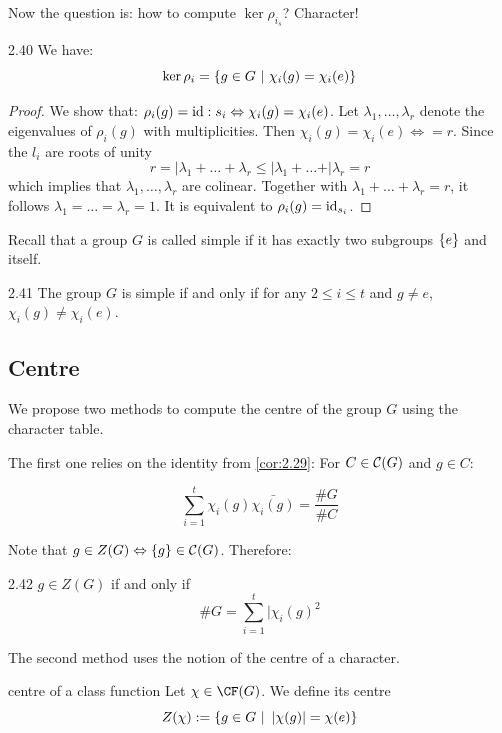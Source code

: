 \documentclass[twoside = false,	%
		headsepline,		%
		parskip = true,
		]{scrbook}						%
\begin{document}
        Now the question is: how to compute $\ker\rho_{i_s}$? Character!
        
        \begin{lemma}{}{2.40}
            We have: $$\ker\rho_i = \left\{  g\in G \ | \ \chi_i(g)=\chi_i(e)\right\}$$     
        \end{lemma}
        \begin{proof}
            We show that: $\rho_i(g)=\mathrm{id}:{s_i}\Leftrightarrow \chi_i(g)=\chi_i(e)$.
            Let $\lambda_1,\dots, \lambda_r$ denote the eigenvalues of $\rho_i(g)$ with multiplicities. Then $\chi_i(g)=\chi_i(e) \Leftrightarrow = r$. Since the $l_i$ are roots of unity
            $$r=\vert{\lambda_1+\dots+\lambda_r}\leq\vert{\lambda_1}+\dots+\vert{\lambda_r}=r$$
            which implies that $\lambda_1,\dots,\lambda_r$ are colinear. Together with $\lambda_1+\dots +\lambda_r=r$, it follows $\lambda_1=\dots =\lambda_r=1$. It is equivalent to $\rho_i(g)=\mathrm{id}_{s_i}$.
        \end{proof}
    
        Recall that a group $G$ is called simple if it has exactly two subgroups $\left\{ e\right\}$ and itself.
        
        \begin{corollary}{}{2.41}
            The group $G$ is simple if and only if for any $2\leq i \leq t$ and $g\neq e$, $\chi_i(g)\neq \chi_i(e)$.     
        \end{corollary}
        
    \subsection{Centre}

        We propose two methods to compute the centre of the group $G$ using the character table.

        The first one relies on the identity from \ref{cor:2.29}: For $C\in\mathcal C(G)$ and $g\in C$:
        
        $$\sum_{i=1}^t \chi_i(g)\bar{\chi_i(g)}=\frac{\#G}{\#C}$$

        Note that $g\in Z(G)\Leftrightarrow \left\{ g\right\} \in \mathcal C(G)$. Therefore:
        
        \begin{corollary}{}{2.42}
            $g\in Z(G)$ if and only if $$\#G=\sum_{i=1}^t\vert{\chi_i(g)}^2$$
        \end{corollary}

        The second method uses the notion of the centre of a character. 
        \begin{definition*}{centre of a class function}
            Let $\chi\in\CF(G)$. We define its centre $$ Z(\chi):=\curly{g\in G \ | \ \vert{\chi(g)}=\chi(e)}$$
        \end{definition*}
    
\end{document}
